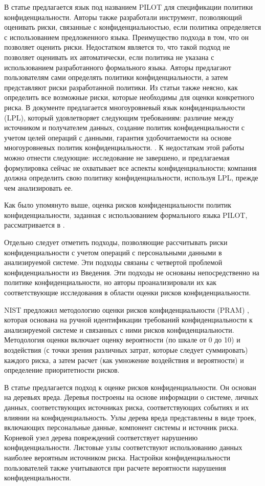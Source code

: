 \documentclass[../main]{subfiles}
\begin{document}
В статье \cite{MDPI14} предлагается язык под названием PILOT для спецификации политики конфиденциальности. Авторы также разработали инструмент, позволяющий оценивать риски, связанные с конфиденциальностью, если политика определяется с использованием предложенного языка. Преимущество подхода в том, что он позволяет оценить риски. Недостатком является то, что такой подход не позволяет оценивать их автоматически, если политика не указана с использованием разработанного формального языка. Авторы предлагают пользователям сами определять политики конфиденциальности, а затем представляют риски разработанной политики. Из статьи также неясно, как определить все возможные риски, которые необходимы для оценки конкретного риска.
В документе \cite{MDPI15} предлагается многоуровневый язык конфиденциальности (LPL), который удовлетворяет следующим требованиям: различие между источником и получателем данных, создание политик конфиденциальности с учетом целей операций с данными, гарантия удобочитаемости на основе многоуровневых политик конфиденциальности. . К недостаткам этой работы можно отнести следующие: исследование не завершено, и предлагаемая формулировка сейчас не охватывает все аспекты конфиденциальности; компания должна определить свою политику конфиденциальности, используя LPL, прежде чем анализировать ее.

Как было упомянуто выше, оценка рисков конфиденциальности политик конфиденциальности, заданная с использованием формального языка PILOT, рассматривается в \cite{MDPI14}.

Отдельно следует отметить подходы, позволяющие рассчитывать риски конфиденциальности с учетом операций с персональными данными в анализируемой системе. Эти подходы связаны с четвертой проблемой конфиденциальности из Введения. Эти подходы не основаны непосредственно на политике конфиденциальности, но авторы проанализировали их как соответствующие исследования в области оценки рисков конфиденциальности.

NIST предложил методологию оценки рисков конфиденциальности (PRAM) \cite{MDPI16}, которая основана на ручной идентификации требований конфиденциальности к анализируемой системе и связанных с ними рисков конфиденциальности. Методология оценки включает оценку вероятности (по шкале от 0 до 10) и воздействия (с точки зрения различных затрат, которые следует суммировать) каждого риска, а затем расчет (как умножение воздействия и вероятности) и определение приоритетности рисков.

В статье \cite{MDPI17} предлагается подход к оценке рисков конфиденциальности. Он основан на деревьях вреда. Деревья построены на основе информации о системе, личных данных, соответствующих источниках риска, соответствующих событиях и их влиянии на конфиденциальность. Узлы дерева вреда представлены в виде троек, включающих персональные данные, компонент системы и источник риска. Корневой узел дерева повреждений соответствует нарушению конфиденциальности. Листовые узлы соответствуют использованию данных наиболее вероятным источником риска. Настройки конфиденциальности пользователей также учитываются при расчете вероятности нарушения конфиденциальности.
\end{document}
